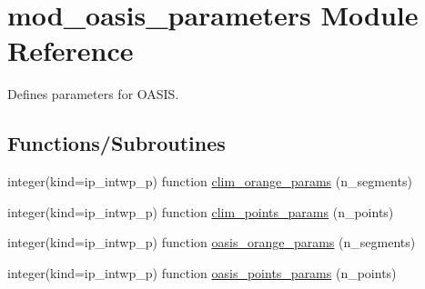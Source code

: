 \hypertarget{namespacemod__oasis__parameters}{}\section{mod\+\_\+oasis\+\_\+parameters Module Reference}
\label{namespacemod__oasis__parameters}


Defines parameters for O\+A\+S\+IS.  


\subsection*{Functions/\+Subroutines}
\begin{DoxyCompactItemize}
\item 
integer(kind=ip\+\_\+intwp\+\_\+p) function \hyperlink{namespacemod__oasis__parameters_abf6fb2dbeee19674bef02b0c1fc7dc2f}{clim\+\_\+orange\+\_\+params} (n\+\_\+segments)
\item 
integer(kind=ip\+\_\+intwp\+\_\+p) function \hyperlink{namespacemod__oasis__parameters_a1f4f746e95fc0b05147aaa0b82a77a54}{clim\+\_\+points\+\_\+params} (n\+\_\+points)
\item 
integer(kind=ip\+\_\+intwp\+\_\+p) function \hyperlink{namespacemod__oasis__parameters_a3f85c99a22ed2a7ac207c8f21c1a363c}{oasis\+\_\+orange\+\_\+params} (n\+\_\+segments)
\item 
integer(kind=ip\+\_\+intwp\+\_\+p) function \hyperlink{namespacemod__oasis__parameters_a4fe64d20b93b278465a4842c6a844501}{oasis\+\_\+points\+\_\+params} (n\+\_\+points)
\end{DoxyCompactItemize}
